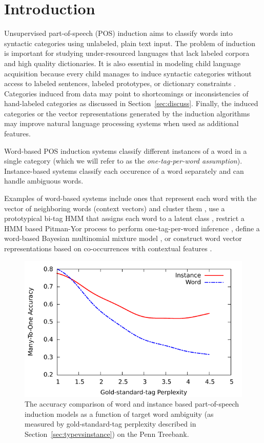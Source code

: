 \section{Introduction} \label{sec:intro}

Unsupervised part-of-speech (POS) induction aims to classify words
into syntactic categories using unlabeled, plain text input.  The
problem of induction is important for studying under-resourced
languages that lack labeled corpora and high quality dictionaries.  It
is also essential in modeling child language acquisition because every
child manages to induce syntactic categories without access to labeled
sentences, labeled prototypes, or dictionary constraints
\cite{ambridge2011child}.  Categories induced from data may point to
shortcomings or inconsistencies of hand-labeled categories as
discussed in Section~\ref{sec:discuss}.  Finally, the induced
categories or the vector representations generated by the induction
algorithms may improve natural language processing systems when used
as additional features.

Word-based POS induction systems classify different instances of a
word in a single category (which we will refer to as the {\em
  one-tag-per-word assumption}).  Instance-based systems classify each
occurence of a word separately and can handle ambiguous words.

Examples of word-based systems include ones that represent each word
with the vector of neighboring words (context vectors) and
cluster them
\cite{Schutze:1995:DPT:976973.976994,lamar-EtAl:2010:Short,Lamar:2010:LCU:1870658.1870736},
use a prototypical bi-tag HMM that assigns each word to a latent
class
\cite{Brown:1992:CNG:176313.176316,Clark:2003:CDM:1067807.1067817},
restrict a HMM based Pitman-Yor process to perform one-tag-per-word
inference \cite{blunsom-cohn:2011:ACL-HLT2011}, define a word-based
Bayesian multinomial mixture model
\cite{christodoulopoulos-goldwater-steedman:2011:EMNLP}, or construct
word vector representations based on co-occurrences with contextual
features \cite{yatbaz-sert-yuret:2012:EMNLP-CoNLL}.

\begin{figure}[t] \centering
  \includegraphics[width=.7\textwidth]{ksmooth-f.pdf} 
  \caption{The accuracy comparison of word and instance based
    part-of-speech induction models as a function of target word
    ambiguity (as measured by gold-standard-tag perplexity described
    in Section~\ref{sec:typevsinstance}) on the Penn Treebank.}
  \label{fig:perplexity}
\end{figure}

